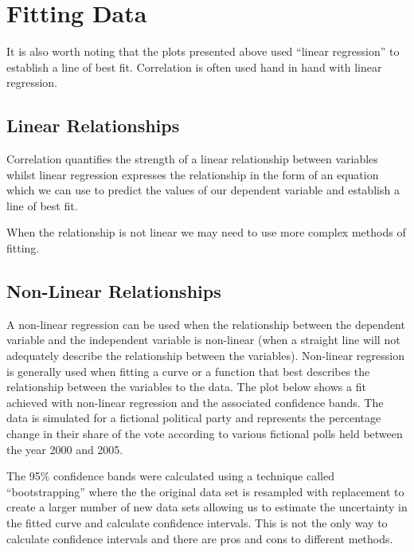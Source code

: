 \documentclass[
]{book}
\begin{document}
\hypertarget{fitting-data}{%
\section{Fitting Data}\label{fitting-data}}

It is also worth noting that the plots presented above used ``linear regression'' to establish a line of best fit. Correlation is often used hand in hand with linear regression.

\hypertarget{linear-relationships}{%
\subsection{Linear Relationships}\label{linear-relationships}}

Correlation quantifies the strength of a linear relationship between variables whilst linear regression expresses the relationship in the form of an equation which we can use to predict the values of our dependent variable and establish a line of best fit.

When the relationship is not linear we may need to use more complex methods of fitting.

\hypertarget{non-linear-relationships}{%
\subsection{Non-Linear Relationships}\label{non-linear-relationships}}

A non-linear regression can be used when the relationship between the dependent variable and the independent variable is non-linear (when a straight line will not adequately describe the relationship between the variables). Non-linear regression is generally used when fitting a curve or a function that best describes the relationship between the variables to the data. The plot below shows a fit achieved with non-linear regression and the associated confidence bands. The data is simulated for a fictional political party and represents the percentage change in their share of the vote according to various fictional polls held between the year 2000 and 2005.

The 95\% confidence bands were calculated using a technique called ``bootstrapping'' where the the original data set is resampled with replacement to create a larger number of new data sets allowing us to estimate the uncertainty in the fitted curve and calculate confidence intervals. This is not the only way to calculate confidence intervals and there are pros and cons to different methods.
\end{document}

